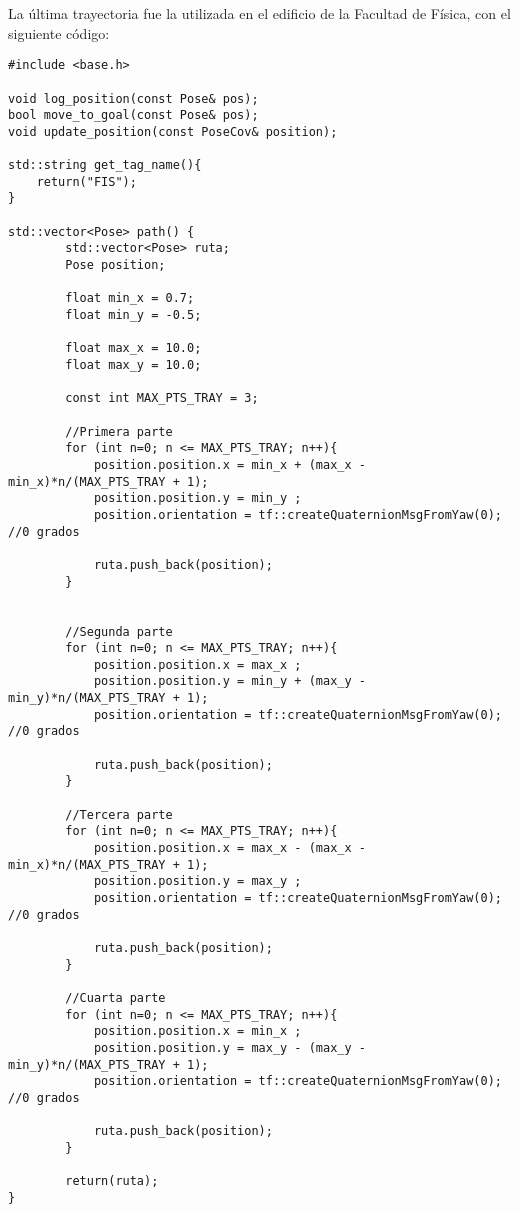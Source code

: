 La última trayectoria fue la utilizada en el edificio de la Facultad de Física, con el siguiente código:
\begin{lstlisting}
#include <base.h>

void log_position(const Pose& pos);
bool move_to_goal(const Pose& pos);
void update_position(const PoseCov& position);

std::string get_tag_name(){
    return("FIS");
}

std::vector<Pose> path() {
        std::vector<Pose> ruta;
        Pose position;

        float min_x = 0.7;
        float min_y = -0.5;

        float max_x = 10.0;
        float max_y = 10.0;

        const int MAX_PTS_TRAY = 3;

        //Primera parte
        for (int n=0; n <= MAX_PTS_TRAY; n++){
            position.position.x = min_x + (max_x - min_x)*n/(MAX_PTS_TRAY + 1);
            position.position.y = min_y ;            
            position.orientation = tf::createQuaternionMsgFromYaw(0); //0 grados
           
            ruta.push_back(position);
        }


        //Segunda parte
        for (int n=0; n <= MAX_PTS_TRAY; n++){
            position.position.x = max_x ;
            position.position.y = min_y + (max_y - min_y)*n/(MAX_PTS_TRAY + 1);
            position.orientation = tf::createQuaternionMsgFromYaw(0); //0 grados
            
            ruta.push_back(position);
        }

        //Tercera parte
        for (int n=0; n <= MAX_PTS_TRAY; n++){
            position.position.x = max_x - (max_x - min_x)*n/(MAX_PTS_TRAY + 1);
            position.position.y = max_y ;
            position.orientation = tf::createQuaternionMsgFromYaw(0); //0 grados
            
            ruta.push_back(position);
        }

        //Cuarta parte
        for (int n=0; n <= MAX_PTS_TRAY; n++){
            position.position.x = min_x ;
            position.position.y = max_y - (max_y - min_y)*n/(MAX_PTS_TRAY + 1);
            position.orientation = tf::createQuaternionMsgFromYaw(0); //0 grados
            
            ruta.push_back(position);
        }

        return(ruta);
}
\end{lstlisting}

